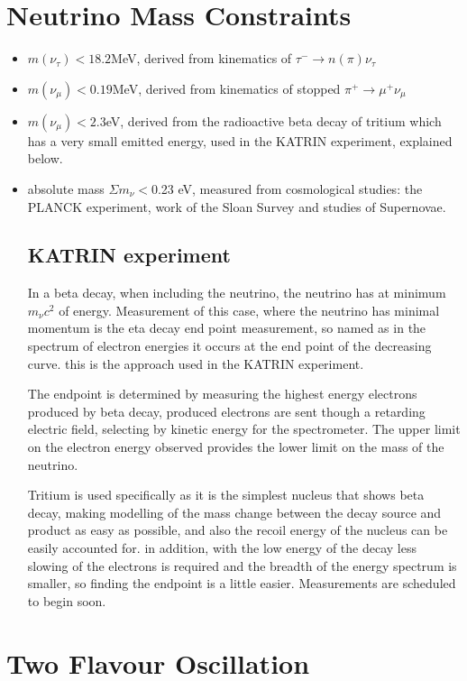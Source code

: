 \documentclass[]{article}
\begin{document}
\section{Neutrino Mass Constraints}

	\begin{itemize}
		\item $m(\nu_\tau) < 18.2$MeV, derived from kinematics of $\tau^-\rightarrow n(\pi)\nu_\tau$
		\item $m(\nu_\mu) < 0.19$MeV, derived from kinematics of stopped $\pi^+\rightarrow \mu^+\nu_\mu$
		\item $m(\nu_\mu) < 2.3$eV, derived from the radioactive beta decay of tritium which has a very small emitted energy, used in the KATRIN experiment, explained below.
		\item absolute mass $\Sigma m_\nu < $0.23 eV, measured from cosmological studies: the PLANCK experiment, work of the Sloan Survey and studies of Supernovae.
		
		\subsection{KATRIN experiment}
			In a beta decay, when including the neutrino, the neutrino has at minimum $m_\nu c^2$ of energy. Measurement of this case, where the neutrino has minimal momentum is the eta decay end point measurement, so named as in the spectrum of electron energies it occurs at the end point of the decreasing curve. this is the approach used in the KATRIN experiment.
			
			The endpoint is determined by measuring the highest energy electrons produced by beta decay, produced electrons are sent though a retarding electric field, selecting by kinetic energy for the spectrometer. The upper limit on the electron energy observed provides the lower limit on the mass of the neutrino.
			
			Tritium is used specifically as it is the simplest nucleus that shows beta decay, making modelling of the mass change between the decay source and product as easy as possible, and also the recoil energy of the nucleus can be easily accounted for. in addition, with the low energy of the decay less slowing of the electrons is required and the breadth of the energy spectrum is smaller, so finding the endpoint is a little easier. Measurements are scheduled to begin soon.
		
	\end{itemize}
	
\section{Two Flavour Oscillation}
\newpage
\end{document}
